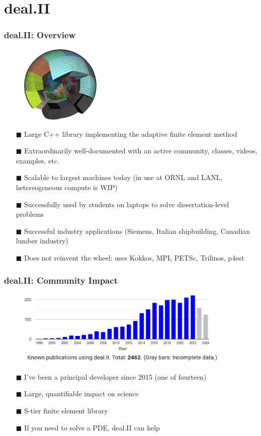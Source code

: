\documentclass[8pt]{beamer}
\begin{document}
\section{deal.II}
\begin{frame}
    \frametitle{deal.II: Overview}
    \begin{figure}
        \centering
        \includegraphics[width=1.5in]{step-32.3d-sphere.partition.cropped.png}
    \end{figure}
    \begin{itemize}
        \item[$\blacksquare$] Large C++ library implementing the adaptive finite element method
        \item[$\blacksquare$] Extraordinarily well-documented with an active 
                             community, classes, videos, examples, etc.
        \item[$\blacksquare$] Scalable to largest machines today (in use at ORNL
          and LANL, hetereogeneous compute is WIP)
        \item[$\blacksquare$] Successfully used by students on laptops to solve dissertation-level problems
        \item[$\blacksquare$] Successful industry applications (Siemens, Italian
          shipbuilding, Canadian lumber industry)
        \item[$\blacksquare$] Does not reinvent the wheel: uses Kokkos, MPI, PETSc, Trilinos, p4est
    \end{itemize}
\end{frame}

\begin{frame}
    \frametitle{deal.II: Community Impact}
    \begin{figure}
        \centering
        \includegraphics[width=4in]{publications.png}
    \end{figure}
    \begin{itemize}
        \item[$\blacksquare$] I've been a principal developer since 2015 (one of fourteen)
        \item[$\blacksquare$] Large, quantifiable impact on science
        \item[$\blacksquare$] S-tier finite element library
        \item[$\blacksquare$] If you need to solve a PDE, deal.II can help
    \end{itemize}
\end{frame}
\end{document}
